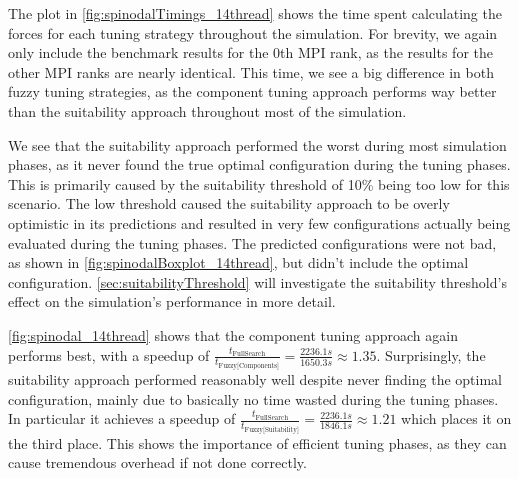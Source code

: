 The plot in \autoref{fig:spinodalTimings_14thread} shows the time spent calculating the forces for each tuning strategy throughout the simulation. For brevity, we again only include the benchmark results for the 0th MPI rank, as the results for the other MPI ranks are nearly identical. This time, we see a big difference in both fuzzy tuning strategies, as the component tuning approach performs way better than the suitability approach throughout most of the simulation.

We see that the suitability approach performed the worst during most simulation phases, as it never found the true optimal configuration during the tuning phases. This is primarily caused by the suitability threshold of 10\% being too low for this scenario. The low threshold caused the suitability approach to be overly optimistic in its predictions and resulted in very few configurations actually being evaluated during the tuning phases. The predicted configurations were not bad, as shown in \autoref{fig:spinodalBoxplot_14thread}, but didn't include the optimal configuration. \autoref{sec:suitabilityThreshold} will investigate the suitability threshold's effect on the simulation's performance in more detail.

\autoref{fig:spinodal_14thread} shows that the component tuning approach again performs best, with a speedup of $\frac{t_{\text{FullSearch}}}{t_{\text{Fuzzy[Components]}}} = \frac{2236.1s}{1650.3s} \approx 1.35$. Surprisingly, the suitability approach performed reasonably well despite never finding the optimal configuration, mainly due to basically no time wasted during the tuning phases. In particular it achieves a speedup of $\frac{t_{\text{FullSearch}}}{t_{\text{Fuzzy[Suitability]}}} = \frac{2236.1s}{1846.1s} \approx 1.21$ which places it on the third place. This shows the importance of efficient tuning phases, as they can cause tremendous overhead if not done correctly.

\newpage

